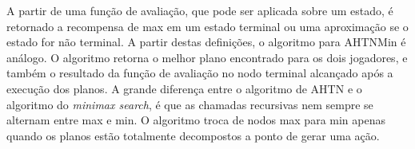A partir de uma função de avaliação, que pode ser aplicada sobre um estado, é retornado a recompensa de max em um estado terminal ou uma aproximação se o estado for não terminal. A partir destas definições, o algoritmo para AHTNMin é análogo. O algoritmo retorna o melhor plano encontrado para os dois jogadores, e também o resultado da função de avaliação no nodo terminal alcançado após a execução dos planos. A grande diferença entre o algoritmo de AHTN e o algoritmo do \textit{minimax search}, é que as chamadas recursivas nem sempre se alternam entre max e min. O algoritmo troca de nodos max para min apenas quando os planos estão totalmente decompostos a ponto de gerar uma ação. 

